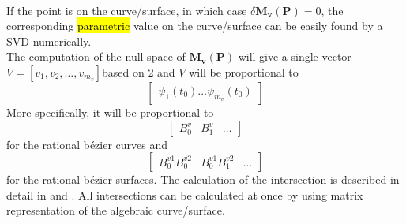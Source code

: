 \paragraph{}
If the point is on the curve/surface, in which case $\delta\mathbf{M_v}(\mathbf{P}) = 0$, the corresponding \hl{parametric} value on the curve/surface can be easily found by a SVD numerically.\\
The computation of the null space of $\mathbf{M_v}(\mathbf{P}) $ will give a single vector $V=[v_1,v_2,\dots,v_{m_v}]$based on 2 and $V$ will be proportional to 
\begin{equation}
	\begin{bmatrix}
	\psi_1(t_0) \dots \psi_{m_v}(t_0)
	\end{bmatrix}
\end{equation}
More specifically, it will be proportional to
\begin{equation}
	\begin{bmatrix}
		B_0^v & B_1^v & \dots
	\end{bmatrix}
\end{equation}
for the rational bézier curves and
\begin{equation}
	\begin{bmatrix}
		B_0^{v1}B_0^{v2} & B_0^{v1}B_1^{v2} & \dots
	\end{bmatrix}
\end{equation}
for the rational bézier surfaces.
%
The calculation of the intersection is described in detail in \citep{Buse2010} and \citep{Ba2009}.
All intersections can be calculated at once by using matrix representation of the algebraic curve/surface.
